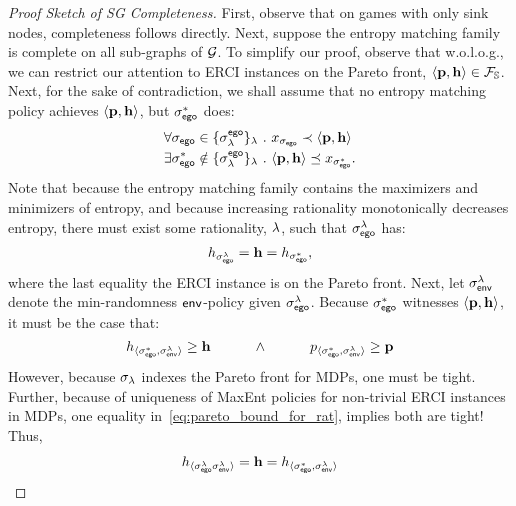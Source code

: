 \begin{proof}[Proof Sketch of SG Completeness]
  First, observe that on games with only sink nodes, completeness
  follows directly.  Next, suppose the entropy matching family is
  complete on all sub-graphs of $\mathcal{G}$. To simplify our proof, observe
  that w.o.l.o.g., we can restrict our attention to ERCI instances
  on the Pareto front, $\langle \mathbf{p},\mathbf{h}\rangle \in \mathcal{F}_{\mathbb{S}}$.
  Next, for the sake of contradiction, we shall assume that no entropy
  matching policy achieves $\langle \mathbf{p},\mathbf{h}\rangle$,
  but $\sigma_{\mathsf{ego}}^*$ does:
  \begin{align}
    &\forall \sched_\pOne \in \{\sched^{\pOne}_\rat\}_\rat~.~ x_{\sched_{\pOne}} \prec \langle \scthreshold, \randomness \rangle\label{eq:reject}\\
    &\exists \sched_\pOne^* \notin \{\sched^{\pOne}_\rat\}_\rat~.~  \langle \scthreshold, \randomness \rangle \preceq x_{\sched_{\pOne}^*}\label{eq:incomplete}.
  \end{align}
  Note that because the entropy matching family contains the maximizers and minimizers
  of entropy, and because increasing rationality monotonically decreases entropy,
  there must exist some rationality, $\lambda$, such that $\sigma_{\mathsf{ego}}^\lambda$ has:
  \begin{equation}
    h_{\sigma_{\mathsf{ego}}^\lambda} = \mathbf{h} = h_{\sigma_{\mathsf{ego}}^*},
  \end{equation}
  where the last equality the ERCI instance is on the Pareto front.
  Next, let $\sigma_{\mathsf{env}}^\lambda$ denote the min-randomness
  $\mathsf{env}$-policy given $\sigma_{\mathsf{ego}}^{\lambda}$. Because $\sigma_{\mathsf{ego}}^*$
  witnesses $\langle\mathbf{p}, \mathbf{h}\rangle$, it must be the case
  that:
  \begin{equation}\label{eq:pareto_bound_for_rat}
    \rndp_{\langle \sched_\pOne^*, \sched_\pTwo^\rat \rangle} \geq \randomness
    \hspace{3em} \wedge \hspace{3em}
    \scp_{\langle \sched_\pOne^*, \sched_\pTwo^\rat\rangle} \geq \scthreshold
  \end{equation}
  However, because $\sigma_\lambda$ indexes the Pareto front for MDPs,
  one must be tight. Further, because of uniqueness of MaxEnt policies
  for non-trivial ERCI instances in MDPs, one equality
  in~\eqref{eq:pareto_bound_for_rat}, implies both are tight! Thus,
  \begin{equation}
    \begin{split}
      &\rndp_{\langle \sched_\pOne^\rat \sched_\pTwo^\rat \rangle} = \randomness = \rndp_{\langle \sched_\pOne^*, \sched_\pTwo^\rat \rangle}\\

\end{split}
\end{equation}
\end{proof}
